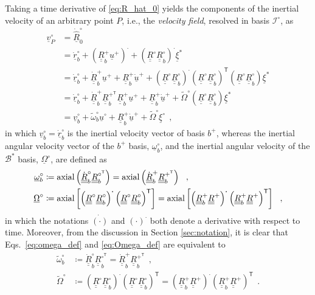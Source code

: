 \documentclass[12pt,a4paper,oneside,english]{abntex2} %
\newcommand{\vect}[1]{\underline{#1}}
\def\tens#1{\underline{\underline{#1}}}
\def\til#1{\widetilde{#1}}
\def\lb{\left[}
\def\rb{\right]}
\def\lp{\left(}
\def\rp{\right)}
\def\T{\mathsf{T}}
\def\bp{b^+}
\def\Io{\mathcal{I}^{\circ}}
\def\axial{\textnormal{axial}}
\def\dotout{^{\boldsymbol{\cdot}}}
\def\R{\tens{R}}
\def\Rp{\R^+}
\def\Ro{\R^{\circ}}
\def\Rbp{\R^{+}_b}
\def\RbpT{\R^{+^\T}_b}
\def\Rbpdot{\dot{\R}^{+}_b}
\def\Rbo{\R^{\circ}_b}
\def\RboT{\R^{\circ^\T}_b}
\def\Rbodot{\dot{\R}^{\circ}_b}
\def\rbodot{\dot{\vect{r}}^{\circ}_b}
\def\u{\vect{u}}
\def\uplus{\u^{+}}
\def\uo{\u^{\circ}}
\def\updot{\dot{\u}^{+}}
\def\vb{\vect{v}_b}
\def\vbo{\vb^{\circ}}
\def\vP{\vect{v}_P}
\def\vPo{\vP^{\circ}}
\def\om{\vect{\omega}_b}
\def\omo{\om^{\circ}}
\def\omtil{\til{\omega}_b}
\def\omtilo{\omtil^{\circ}}
\def\xis{\vect{\xi}^{*}}
\def\xio{\vect{\xi}^{\circ}}
\def\Om{\vect{\Omega}}
\def\Omo{\Om^{\circ}}
\def\Omtil{\til{\Omega}}
\def\Omtilo{\Omtil^{\circ}}
\begin{document}
Taking a time derivative of \cref{eq:R_hat_0} yields the components of the inertial velocity of an arbitrary point $P$, i.e., the \textit{velocity field}, resolved in basis $\Io$, as
\begin{align}
    \vPo &= \dot{\hat{\vect{R}}}^{\circ}_0 \nonumber 
    \\
    &= \rbodot + \lp\Rbp\uplus\rp\dotout + \lp\Ro\Rbo\rp\dotout \xis \nonumber 
    \\
    &= \rbodot + \Rbpdot\uplus + \Rbp\updot + \lp\Ro\Rbo\rp\dotout \lp\Ro\Rbo\rp^\T \lp\Ro\Rbo\rp \xis \nonumber 
    \\
    &= \rbodot + \Rbpdot\RbpT\Rbp\uplus + \Rbp\updot + \Omtilo \lp\Ro\Rbo\rp \xis \nonumber
    \\
    &= \vbo + \omtilo\uo + \Rbp\updot + \Omtilo\xio \ \ ,
    \label{eq:v_P_o}    
\end{align}
in which $\vbo =  \rbodot$ is the inertial velocity vector of basis $\bp$, whereas the inertial angular velocity vector of the $\bp$ basis, $\omo$, and the inertial angular velocity of the $\mathcal{B}^{*}$ basis, $\Omo$, are defined as
\begin{align}
    \omo &\coloneqq \axial\lp\Rbodot\RboT\rp =
    \axial\lp\Rbpdot\RbpT\rp \ \ ,
    \label{eq:omega_def}
    \\
    \Omo &\coloneqq \axial\lb\lp\Ro\Rbo\rp\dotout \lp\Ro\Rbo\rp^\T\rb =
    \axial\lb\lp\Rbp\Rp\rp\dotout \lp\Rbp\Rp\rp^\T\rb \ \ ,
    \label{eq:Omega_def}    
\end{align}
in which the notations $\dot{(\cdot)}$ and $(\cdot)\dotout$ both denote a derivative with respect to time. Moreover, from the discussion in Section \ref{sec:notation}, it is clear that Eqs.~\eqref{eq:omega_def} and \eqref{eq:Omega_def} are equivalent to
\begin{align}
    \omtilo &\coloneqq \Rbodot\RboT =
    \Rbpdot\RbpT \ \ ,
    \label{eq:omegatil_def}
    \\
    \Omtilo &\coloneqq \lp\Ro\Rbo\rp\dotout \lp\Ro\Rbo\rp^\T =
    \lp\Rbp\Rp\rp\dotout \lp\Rbp\Rp\rp^\T \ \ .
    \label{eq:Omegatil_def}    
\end{align}
\end{document}
